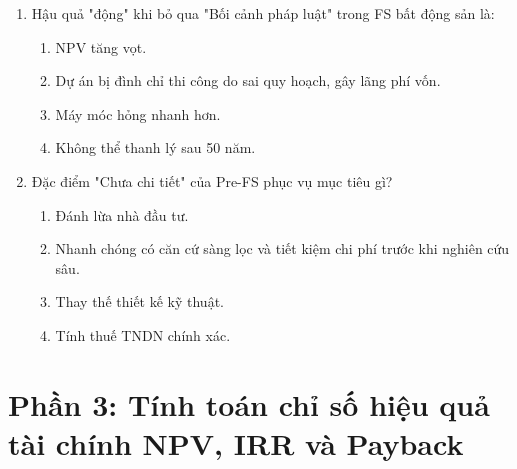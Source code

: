 \begin{enumerate}[label=\textbf{Câu \arabic*:}, leftmargin=*, resume]
\item Hậu quả "động" khi bỏ qua "Bối cảnh pháp luật" trong FS bất động sản là:
\begin{enumerate}[label=\Alph*.]
    \item NPV tăng vọt.
    \item Dự án bị đình chỉ thi công do sai quy hoạch, gây lãng phí vốn.
    \item Máy móc hỏng nhanh hơn.
    \item Không thể thanh lý sau 50 năm.
\end{enumerate}

\item Đặc điểm "Chưa chi tiết" của Pre-FS phục vụ mục tiêu gì?
\begin{enumerate}[label=\Alph*.]
    \item Đánh lừa nhà đầu tư.
    \item Nhanh chóng có căn cứ sàng lọc và tiết kiệm chi phí trước khi nghiên cứu sâu.
    \item Thay thế thiết kế kỹ thuật.
    \item Tính thuế TNDN chính xác.
\end{enumerate}

\end{enumerate}

\section{Phần 3: Tính toán chỉ số hiệu quả tài chính NPV, IRR và Payback}

